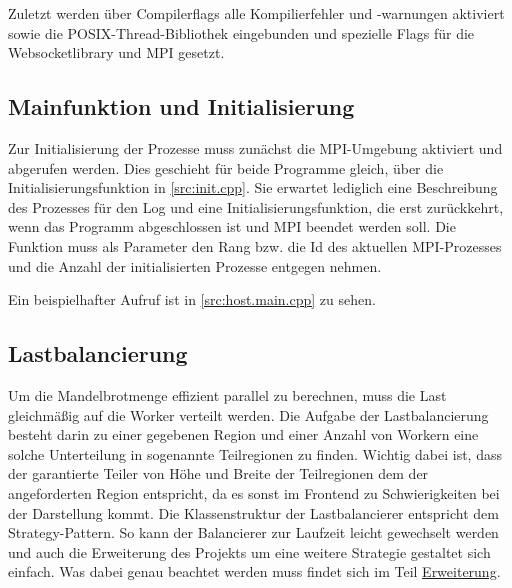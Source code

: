 Zuletzt werden über Compilerflags alle Kompilierfehler und -warnungen aktiviert sowie die POSIX-Thread-Bibliothek eingebunden
und spezielle Flags für die Websocketlibrary und MPI gesetzt.

\subsection{Mainfunktion und Initialisierung}

Zur Initialisierung der Prozesse muss zunächst die MPI-Umgebung aktiviert und abgerufen werden.
Dies geschieht für beide Programme gleich, über die Initialisierungsfunktion in \autoref{src:init.cpp}.
Sie erwartet lediglich eine Beschreibung des Prozesses für den Log und eine Initialisierungsfunktion,
die erst zurückkehrt, wenn das Programm abgeschlossen ist und MPI beendet werden soll.
Die Funktion muss als Parameter den Rang bzw. die Id des aktuellen MPI-Prozesses und die Anzahl der initialisierten
Prozesse entgegen nehmen.

Ein beispielhafter Aufruf ist in \autoref{src:host.main.cpp} zu sehen.

\begin{figure}
    
\end{figure}


\begin{figure}
    
\end{figure}

\subsection{Lastbalancierung}
Um die Mandelbrotmenge effizient parallel zu berechnen, muss die Last gleichmäßig auf die Worker verteilt werden.
Die Aufgabe der Lastbalancierung besteht darin zu einer gegebenen Region und einer Anzahl von Workern eine solche Unterteilung in sogenannte Teilregionen zu finden.
Wichtig dabei ist, dass der garantierte Teiler von Höhe und Breite der Teilregionen dem der angeforderten Region entspricht, da es sonst im Frontend zu Schwierigkeiten bei der Darstellung kommt.
Die Klassenstruktur der Lastbalancierer entspricht dem Strategy-Pattern. So kann der Balancierer zur Laufzeit leicht gewechselt werden und auch die Erweiterung des Projekts um eine weitere Strategie gestaltet sich einfach.
Was dabei genau beachtet werden muss findet sich im Teil \hyperref[lastbalancierung_erweiterung]{Erweiterung}.


